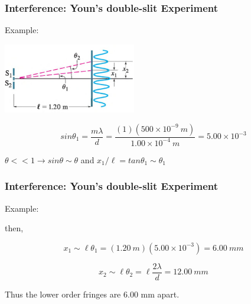 \documentclass[]{beamer}
\begin{document}
\begin{frame}

\frametitle{Interference: Youn's double-slit Experiment}

Example:
\vspace{3mm}

  \begin{center}
  \includegraphics[height=1.2in]{images5/intexample.jpg}
\end{center}


\pause

\begin{equation}
sin\theta_1=\frac{m\lambda}{d}=\frac{(1)(500\times 10^{-9}~m)}{1.00\times 10^{-4}~m}=5.00\times 10^{-3}
\end{equation}


\pause
$\theta<<1\rightarrow sin\theta\sim \theta$ and $x_1/\ell =tan \theta_1\sim \theta_1$












  \end{frame}




\begin{frame}

\frametitle{Interference: Youn's double-slit Experiment}

Example:
\vspace{3mm}

then,



\begin{equation}
x_1\sim \ell \theta_1=(1.20~m)(5.00\times 10^{-3})=6.00~mm
\end{equation}
\pause


\begin{equation}
x_2\sim \ell \theta_2=\ell \frac{2\lambda}{d}=12.00~mm
\end{equation}
\pause

Thus the lower order fringes are 6.00 mm apart.






  \end{frame}
\end{document}

